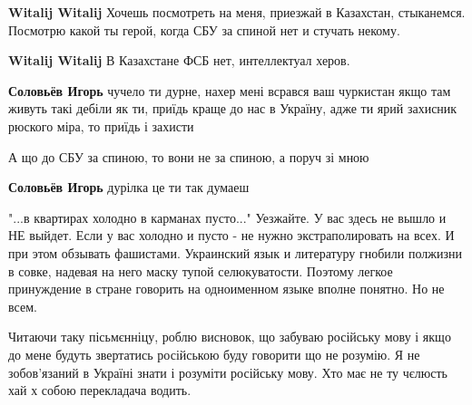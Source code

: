 \begin{itemize}
\begin{itemize}

\textbf{Witalij Witalij} Хочешь посмотреть на меня, приезжай в Казахстан, стыканемся. Посмотрю какой ты герой, когда СБУ за спиной нет и стучать некому.


\textbf{Witalij Witalij} В Казахстане ФСБ нет, интеллектуал херов.


\textbf{Соловьёв Игорь} чучело ти дурне, нахер мені всрався ваш чуркистан якщо там живуть такі дебіли як ти, приїдь краще до нас в Україну, адже ти ярий захисник рюского міра, то приїдь і захисти🤣🤣🤣🤣


А що до СБУ за спиною, то вони не за спиною, а поруч зі мною🤣🤣🤣🤣


\textbf{Соловьёв Игорь} дурілка це ти так думаеш🤣🤣🤣🤣
\end{itemize}



"...в квартирах холодно в карманах пусто..." Уезжайте. У вас здесь не вышло и
НЕ выйдет. Если у вас холодно и пусто - не нужно экстраполировать на всех. И
при этом обзывать фашистами. Украинский язык и литературу гнобили полжизни в
совке, надевая на него маску тупой селюкуватости. Поэтому легкое принуждение в
стране говорить на одноименном языке вполне понятно. Но не всем.




Читаючи таку пісьмєнніцу, роблю висновок, що забуваю російську мову і якщо до
мене будуть звертатись російською буду говорити що не розумію. Я не
зобов'язаний в Україні знати і розуміти російську мову. Хто має не ту чєлюсть
хай х собою перекладача водить.


\end{itemize}
